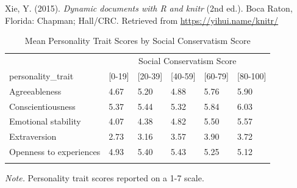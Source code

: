 \documentclass[man]{apa6}
\begin{document}
\leavevmode\hypertarget{ref-R-knitr}{}%
Xie, Y. (2015). \emph{Dynamic documents with R and knitr} (2nd ed.). Boca Raton, Florida: Chapman; Hall/CRC. Retrieved from \url{https://yihui.name/knitr/}

\begin{table}[tbp]
\begin{center}
\begin{threeparttable}
\caption{\label{tab:table1}Mean Personality Trait Scores by Social Conservatism Score}
\begin{tabular}{llllll}
\toprule
 & \multicolumn{5}{c}{Social Conservatism Score} \\
\cmidrule(r){2-6}
personality\_trait & \multicolumn{1}{c}{[0-19]} & \multicolumn{1}{c}{[20-39]} & \multicolumn{1}{c}{[40-59]} & \multicolumn{1}{c}{[60-79]} & \multicolumn{1}{c}{[80-100]}\\
\midrule
Agreeableness & 4.67 & 5.20 & 4.88 & 5.76 & 5.90\\
Conscientiousness & 5.37 & 5.44 & 5.32 & 5.84 & 6.03\\
Emotional stability & 4.07 & 4.38 & 4.82 & 5.50 & 5.57\\
Extraversion & 2.73 & 3.16 & 3.57 & 3.90 & 3.72\\
Openness to experiences & 4.93 & 5.40 & 5.43 & 5.25 & 5.12\\
\bottomrule
\addlinespace
\end{tabular}
\begin{tablenotes}[para]
\normalsize{\textit{Note.} Personality trait scores reported on a 1-7 scale.}
\end{tablenotes}
\end{threeparttable}
\end{center}
\end{table}
\end{document}

